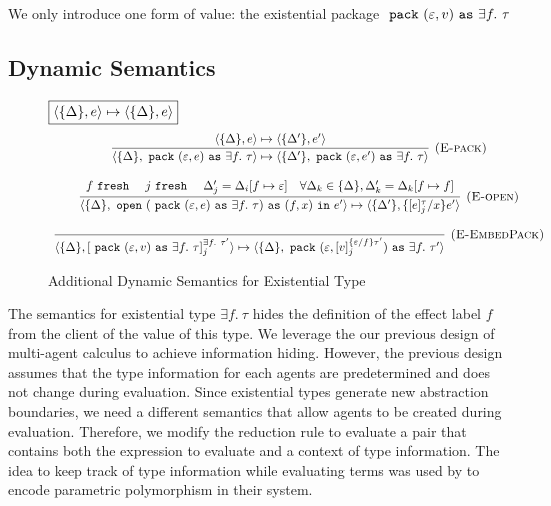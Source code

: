 We only introduce one form of value: the existential package $\m{pack} (\varepsilon, v) \m{as} \exists f.\ \tau$ 


\subsection{Dynamic Semantics}
\begin{figure}[t]
\footnotesize{
\noindent$\fbox{$\langle \{\Delta\}, e \rangle \mapsto \langle \{\Delta\}, e \rangle$}$
\[
\begin{array}{c}

\infer[\textsc{(E-pack)}]
  {\langle \{\Delta\}, \m{pack} (\varepsilon, e) \m{as} \exists f.\ \tau  \rangle \mapsto \langle \{\Delta'\} , \m{pack} (\varepsilon, e') \m{as} \exists f.\ \tau  \rangle}
  {\langle \{\Delta\}, e \rangle \mapsto \langle \{\Delta'\}, e' \rangle} \\[3ex]
  
\infer[\textsc{(E-open)}]
   {\langle \{\Delta\},  \m{open} (\m{pack} (\varepsilon, e) \m{as} \exists f.\ \tau) \m{as} (f, x) \m{in} e'  \rangle \mapsto \langle \{\Delta'\}, \{[e]_j^\tau / x\}e' \rangle}
  {f \m{fresh} & j \m{fresh} & \Delta'_j = \Delta_i[f \mapsto \varepsilon] & \forall \Delta_k \in \{\Delta\}, \Delta_k' = \Delta_k[f \mapsto f]} \\[3ex]
  
\infer[\textsc{(E-EmbedPack)}]
  {\langle \{\Delta\}, [\m{pack} (\varepsilon, v) \m{as} \exists f.\ \tau]^{\exists f.\ \tau'}_j \rangle \mapsto \langle \{\Delta\}, \m{pack} (\varepsilon, [v]^{\{\varepsilon/f\}\tau'}_j) \m{as} \exists f.\ \tau' \rangle}
  {}
  
\end{array}
\]
\label{static-exist}
\caption{Additional Dynamic Semantics for Existential Type}
}
\end{figure}

The semantics for existential type $\exists f.\ \tau$  hides the definition of the effect label $f$ from the client of the value of this type. We leverage the our previous design of multi-agent calculus to achieve information hiding. However, the previous design assumes that the type information for each agents are predetermined and does not change during evaluation. Since existential types generate new abstraction boundaries, we need a different semantics that allow agents to be created during evaluation. Therefore, we modify the reduction rule to evaluate a pair that contains both the expression to evaluate and a context of type information. The idea to keep track of type information while evaluating terms was used by \citet{grossman00} to encode parametric polymorphism in their system.

